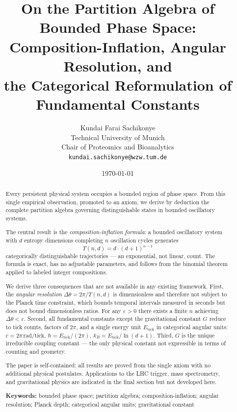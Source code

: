 \documentclass[twocolumn,10pt,a4paper]{article}
\title{\textbf{On the Partition Algebra of Bounded Phase Space:\\
Composition-Inflation, Angular Resolution, and\\
the Categorical Reformulation of Fundamental Constants}}
\author{
Kundai Farai Sachikonye\\
Technical University of Munich\\
Chair of Proteomics and Bioanalytics\\
\texttt{kundai.sachikonye@wzw.tum.de}
}
\date{\today}
\theoremstyle{thmstyle}
\theoremstyle{definition}
\theoremstyle{remark}
\begin{document}
\maketitle

\begin{abstract}
\noindent
Every persistent physical system occupies a bounded region of phase space.
From this single empirical observation, promoted to an axiom, we derive by
deduction the complete partition algebra governing distinguishable states in
bounded oscillatory systems.

The central result is the \emph{composition-inflation formula}:
a bounded oscillatory system with $d$ entropy dimensions completing $n$
oscillation cycles generates
\begin{equation*}
T(n,d) = d \cdot (d+1)^{n-1}
\end{equation*}
categorically distinguishable trajectories — an exponential, not linear,
count. The formula is exact, has no adjustable parameters, and follows
from the binomial theorem applied to labeled integer compositions.

We derive three consequences that are not available in any existing framework.
First, the \emph{angular resolution} $\Delta\theta = 2\pi/T(n,d)$ is
dimensionless and therefore not subject to the Planck time constraint, which
bounds temporal intervals measured in seconds but does not bound dimensionless
ratios. For any $\varepsilon > 0$ there exists a finite $n$ achieving
$\Delta\theta < \varepsilon$.
Second, all fundamental constants except the gravitational constant $G$
reduce to tick counts, factors of $2\pi$, and a single energy unit
$E_{\mathrm{tick}}$ in categorical angular units: $c = 2\pi\,\mathrm{rad/tick}$,
$\hbar = E_{\mathrm{tick}}/(2\pi)$, $k_B = E_{\mathrm{tick}}/\ln(d+1)$.
Third, $G$ is the unique irreducible coupling constant — the only physical
constant not expressible in terms of counting and geometry.

The paper is self-contained: all results are proved from the single axiom
with no additional physical postulates. Applications to the LHC trigger,
mass spectrometry, and gravitational physics are indicated in the final section
but not developed here.

\medskip
\noindent\textbf{Keywords:} bounded phase space; partition algebra;
composition-inflation; angular resolution; Planck depth;
categorical angular units; gravitational constant
\end{abstract}
\end{document}
